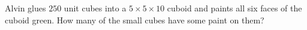 Alvin glues $250$ unit cubes into a $5\times5\times10$ cuboid and paints all six faces of the cuboid green. How many of the small cubes have some paint on them?
